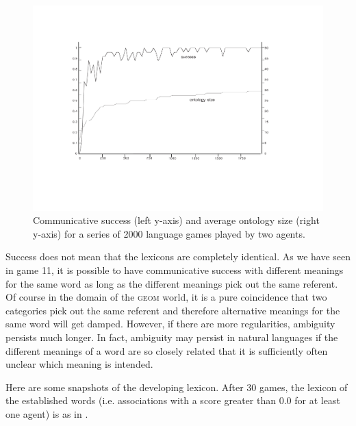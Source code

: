 \begin{figure}[htbp]
  \centerline{\includegraphics[width=\textwidth]{chap6/figs/gsucc3.pdf}}
\caption{\label{gsucc3}Communicative 
success (left y-axis) and average ontology size 
(right y-axis) for a series of 2000
language games played by two agents.} 
\end{figure}
Success does not mean that the lexicons are completely 
identical. As we have seen in game 11, it is possible
to have communicative success with different 
meanings for the same word as long as the different meanings
pick out the same referent. Of course in the domain of
the \textsc{geom} world, it is a pure coincidence that two categories
pick out the same referent and therefore alternative 
meanings for the same word will get damped. However, if there
are more regularities, ambiguity persists much longer. 
In fact, ambiguity may persist in natural languages if 
the different meanings of a word are so 
closely related that it is sufficiently often unclear
which meaning is intended. 

Here are some snapshots of the developing lexicon. 
After 30 games, the lexicon of the established
words (i.e. associations with a score greater 
than 0.0 for at least one agent) is as in . 




